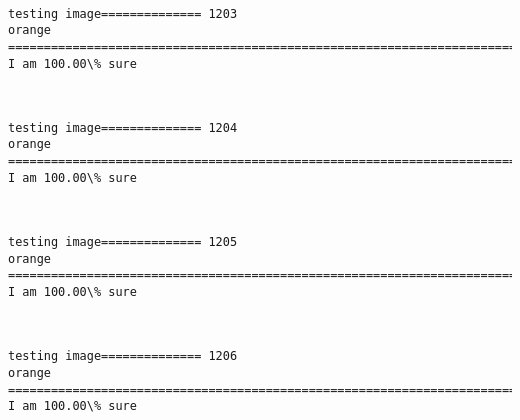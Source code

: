 \documentclass[11pt]{article}
\begin{document}
    \begin{center}
    \end{center}
    { \hspace*{\fill} \\}
    
    \begin{Verbatim}[commandchars=\\\{\}]
testing image============== 1203
orange
============================================================================
I am 100.00\% sure

    \end{Verbatim}

    \begin{center}
    \end{center}
    { \hspace*{\fill} \\}
    
    \begin{Verbatim}[commandchars=\\\{\}]
testing image============== 1204
orange
============================================================================
I am 100.00\% sure

    \end{Verbatim}

    \begin{center}
    \end{center}
    { \hspace*{\fill} \\}
    
    \begin{Verbatim}[commandchars=\\\{\}]
testing image============== 1205
orange
============================================================================
I am 100.00\% sure

    \end{Verbatim}

    \begin{center}
    \end{center}
    { \hspace*{\fill} \\}
    
    \begin{Verbatim}[commandchars=\\\{\}]
testing image============== 1206
orange
============================================================================
I am 100.00\% sure

    \end{Verbatim}
\end{document}
